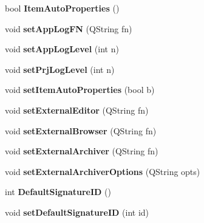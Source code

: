 \begin{DoxyCompactItemize}
\item 
\hypertarget{classConfig_a285978e37f46bf3b82d6114869db3112}{
bool {\bfseries ItemAutoProperties} ()}
\label{classConfig_a285978e37f46bf3b82d6114869db3112}

\item 
\hypertarget{classConfig_a22fcd4a3f446d35b84944668f7aaf349}{
void {\bfseries setAppLogFN} (QString fn)}
\label{classConfig_a22fcd4a3f446d35b84944668f7aaf349}

\item 
\hypertarget{classConfig_a1d65e2c0c5a4c6b572ac061daa1d9c3b}{
void {\bfseries setAppLogLevel} (int n)}
\label{classConfig_a1d65e2c0c5a4c6b572ac061daa1d9c3b}

\item 
\hypertarget{classConfig_a718aa123488877b175872bffe7a9fc98}{
void {\bfseries setPrjLogLevel} (int n)}
\label{classConfig_a718aa123488877b175872bffe7a9fc98}

\item 
\hypertarget{classConfig_ae1079fafbf60797e4077373a5a3e4c39}{
void {\bfseries setItemAutoProperties} (bool b)}
\label{classConfig_ae1079fafbf60797e4077373a5a3e4c39}

\item 
\hypertarget{classConfig_af6e2cad1005339094cd77ac6ed0ac051}{
void {\bfseries setExternalEditor} (QString fn)}
\label{classConfig_af6e2cad1005339094cd77ac6ed0ac051}

\item 
\hypertarget{classConfig_a851583241ac424bde9e2175c6b8035c1}{
void {\bfseries setExternalBrowser} (QString fn)}
\label{classConfig_a851583241ac424bde9e2175c6b8035c1}

\item 
\hypertarget{classConfig_a035453e4020d11d0bb84746848db1d84}{
void {\bfseries setExternalArchiver} (QString fn)}
\label{classConfig_a035453e4020d11d0bb84746848db1d84}

\item 
\hypertarget{classConfig_a2a4cdfea3bd2d337ac915efbd7b1f156}{
void {\bfseries setExternalArchiverOptions} (QString opts)}
\label{classConfig_a2a4cdfea3bd2d337ac915efbd7b1f156}

\item 
\hypertarget{classConfig_a0673f105c48227ed8abd56006e0d9cbf}{
int {\bfseries DefaultSignatureID} ()}
\label{classConfig_a0673f105c48227ed8abd56006e0d9cbf}

\item 
\hypertarget{classConfig_a12a8660f7cc3a1e6bc380c90fab75264}{
void {\bfseries setDefaultSignatureID} (int id)}
\label{classConfig_a12a8660f7cc3a1e6bc380c90fab75264}

\end{DoxyCompactItemize}
